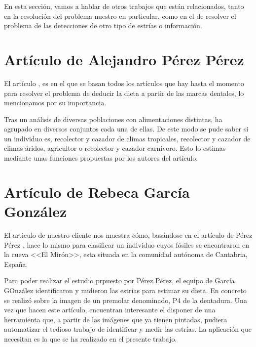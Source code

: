 
En esta sección, vamos a hablar de otros trabajos que están relacionados, tanto en la resolución del problema nuestro en particular, como en el de resolver el problema de las detecciones de otro tipo de estrías o información.

\section{Artículo de Alejandro Pérez Pérez}
El artículo \cite{Lalueza:perez}, es en el que se basan todos los artículos que hay hasta el momento para resolver el problema de deducir la dieta a partir de las marcas dentales, lo mencionamos por su importancia.

Tras un análisis de diversas poblaciones con alimentaciones distintas, ha agrupado en diversos conjuntos cada una de ellas. De este modo se pude saber si un individuo es, recolector y cazador de climas tropicales, recolector y cazador de climas áridos, agricultor o recolector y cazador carnívoro.
Esto lo estimas mediante unas funciones propuestas por los autores del artículo.

\section{Artículo de Rebeca García González}

El articulo \cite{garcia2015dietary} de nuestro cliente nos muestra cómo, basándose en el artículo de Pérez Pérez \cite{Lalueza:perez}, hace lo mismo para clasificar un individuo cuyos fósiles se encontraron en la cueva <<El Mirón>>, esta situada en la comunidad autónoma de Cantabria, España.

Para poder realizar el estudio prpuesto por Pérez Pérez, el equipo de García GOnzález identificaron y midieron las estrías para estimar su dieta. En concreto se realizó sobre la imagen de un premolar denominado, P4 de la dentadura. 
Una vez que hacen este artículo, encuentran interesante el disponer de una herramienta que, a partir de las imágenes que ya tienen pintadas, pudiera automatizar el tedioso trabajo de identificar y medir las estrías. La aplicación que necesitan es la que se ha realizado en el presente trabajo.

